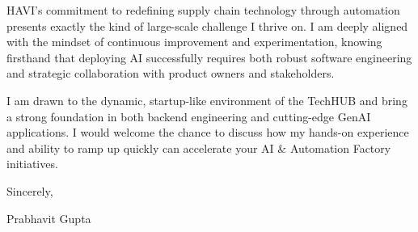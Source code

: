 \documentclass[11pt,a4paper]{article}
\begin{document}
\noindent HAVI’s commitment to redefining supply chain technology through automation presents exactly the kind of large-scale challenge I thrive on. I am deeply aligned with the mindset of continuous improvement and experimentation, knowing firsthand that deploying AI successfully requires both robust software engineering and strategic collaboration with product owners and stakeholders.

\noindent I am drawn to the dynamic, startup-like environment of the TechHUB and bring a strong foundation in both backend engineering and cutting-edge GenAI applications. I would welcome the chance to discuss how my hands-on experience and ability to ramp up quickly can accelerate your AI \& Automation Factory initiatives.

\vspace{10pt}

\noindent Sincerely,

\vspace{10pt}

\noindent Prabhavit Gupta
\end{document}
